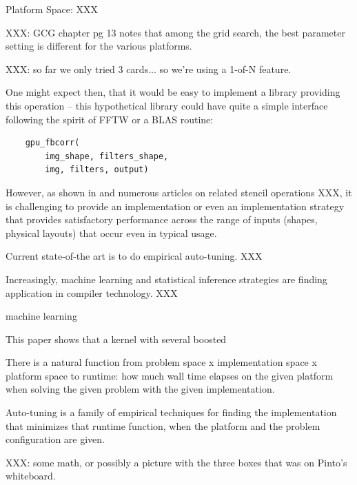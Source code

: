 Platform Space: XXX

XXX: GCG chapter pg 13 notes that among the grid search, the best parameter
setting is different for the various platforms.

XXX: so far we only tried 3 cards... so we're using a 1-of-N feature.





One might expect then, that it would be easy to implement a library providing
this operation -- this hypothetical library could have quite a simple interface
following the spirit of FFTW or a BLAS routine:
\begin{verbatim}
    gpu_fbcorr(
        img_shape, filters_shape,
        img, filters, output)
\end{verbatim}
However, as shown in \citet{pinto+cox:2011gcg} and numerous articles on
related stencil operations XXX, it is challenging to provide an implementation
or even an implementation strategy that provides satisfactory performance
across the range of inputs (shapes, physical layouts) that occur even in
typical usage.

Current state-of-the art is to do empirical auto-tuning.
XXX \vspace{12pt}

Increasingly, machine learning and statistical inference strategies are
finding application in compiler technology.
XXX \vspace{12pt}

machine learning

This paper shows that a kernel with several  boosted


There is a natural function from
problem space x implementation space x platform space to runtime:
how much wall time elapses on the given platform when solving the given
problem with the given implementation.

Auto-tuning is a family of empirical techniques for finding the implementation
that minimizes that runtime function, when the platform and the problem
configuration are given.

XXX: some math, or possibly a picture with the three boxes that was on Pinto's
whiteboard.

